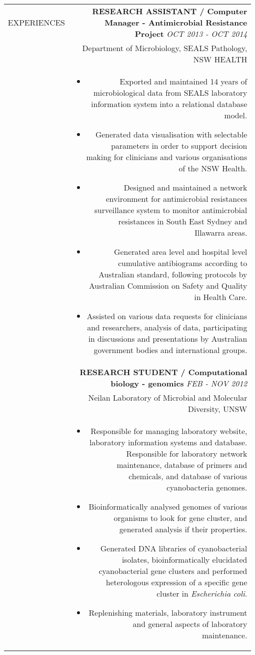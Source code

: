 \documentclass[a4paper,10pt]{article}
\newcommand\VRule{\color{lightgray}\vrule}
\newcommand\HRule{}
\begin{document}
\begin{tabular}{L!{\VRule}R}
\uppercase{Experiences} \HRule 
 & \textbf{\uppercase{Research Assistant} / Computer Manager - Antimicrobial Resistance Project} \hfill\small \textit{OCT 2013 - OCT 2014}\\
 & {Department of Microbiology, SEALS Pathology, NSW HEALTH} \\
 & \begin{itemize}
\item Exported and maintained 14 years of microbiological data from SEALS laboratory information system into a relational database model.
\item Generated data visualisation with selectable parameters in order to support decision making for clinicians and various organisations of the NSW Health.
\item Designed and maintained a network environment for antimicrobial resistances surveillance system to monitor antimicrobial resistances in South East Sydney and Illawarra areas.
\item Generated area level and hospital level cumulative antibiograms according to Australian standard, following protocols by Australian Commission on Safety and Quality in Health Care.
\item Assisted on various data requests for clinicians and researchers, analysis of data, participating in discussions and presentations by Australian government bodies and international groups.
\end{itemize}\\


& \textbf{\uppercase{Research student} / Computational biology - genomics} \hfill\small \textit{FEB - NOV 2012} \\
& Neilan Laboratory of Microbial and Molecular Diversity, UNSW\\
& \begin{itemize}
\item Responsible for managing laboratory website, laboratory information systems and database. Responsible for laboratory network maintenance, database of primers and chemicals, and database of various cyanobacteria genomes.
\item Bioinformatically analysed genomes of various organisms to look for gene cluster, and generated analysis if their properties.
\item Generated DNA libraries of cyanobacterial isolates, bioinformatically elucidated cyanobacterial gene clusters and performed heterologous expression of a specific gene cluster in \textit{Escherichia coli}.
\item Replenishing materials, laboratory instrument and general aspects of laboratory maintenance.
\end{itemize}\\


\end{tabular}
\end{document}
